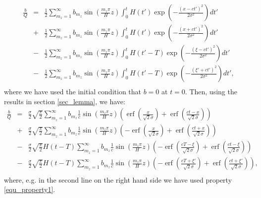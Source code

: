 \documentclass[12pt]{article}
\DeclareMathOperator\erf {erf}
\begin{document}
%
\begin{eqnarray}
\frac{b}{Q}  & = & \frac{1}{2} \sum_{m_z = 1}^{\infty} b_{m_z}\sin \left( \frac{m_z \pi} {H} z\right)\int_0^t H(t') \exp \left( - \frac{ (x-ct')^2 }{2 \sigma^2 } \right) dt'  \\ \nonumber
& + & \frac{1}{2} \sum_{m_z = 1}^{\infty} b_{m_z}  \sin \left( \frac{m_z \pi} {H} z\right) \int_0^t H(t') \exp \left( - \frac{ (x+ct')^2 }{2 \sigma^2} \right) dt' \\ \nonumber
& - & \frac{1}{2} \sum_{m_z = 1}^{\infty} b_{m_z} \sin \left( \frac{m_z \pi} {H} z\right) \int_0^t H(t'-T) \exp \left( - \frac{ (\xi-ct')^2 }{2 \sigma^2} \right) dt'  \\ \nonumber
& - & \frac{1}{2} \sum_{m_z = 1}^{\infty} b_{m_z}  \sin \left( \frac{m_z \pi} {H} z\right) \int_0^t  H(t'-T) \exp \left( - \frac{ ( \xi'+ct')^2 }{2 \sigma ^2} \right) dt', \\ \nonumber
\end{eqnarray}
%
where we have used the initial condition that $b=0$ at $t=0$. Then, using the results in section \ref{sec_lemma}, we have:
%
\begin{eqnarray}
\label{equ_ref}
\frac{b}{Q}  & = & \frac{\sigma}{2} \sqrt{ \frac{\pi}{2} } \sum_{m_z = 1}^{\infty} b_{m_z} \frac{1}{ c }\sin \left( \frac{m_z \pi} {H} z\right) \left(  \erf \left( \frac{x}{\sqrt{2} \sigma} \right) +  \erf \left( \frac{ct-x}{\sqrt{2} \sigma} \right)    \right)  \\ \nonumber
& + & \frac{\sigma}{2}  \sqrt{ \frac{\pi}{2} }  \sum_{m_z = 1}^{\infty} b_{m_z} \frac{ 1 }{ c } \sin \left( \frac{m_z \pi} {H} z\right)\left( - \erf \left( \frac{x}{\sqrt{2} \sigma} \right) + \erf \left( \frac{ct+x }{\sqrt{2} \sigma} \right)    \right) \\ \nonumber
& - & \frac{\sigma}{2}  \sqrt{ \frac{\pi}{2} }H(t-T) \sum_{m_z = 1}^{\infty} b_{m_z}  \frac{1 }{ c }  \sin \left( \frac{m_z \pi} {H} z\right) \left(- \erf \left( \frac{cT-\xi}{\sqrt{2} \sigma} \right) +  \erf \left( \frac{ct-\xi}{\sqrt{2} \sigma} \right)    \right)  \\ \nonumber
& - & \frac{\sigma }{2} \sqrt{ \frac{\pi}{2} }H(t-T)  \sum_{m_z = 1}^{\infty} b_{m_z}  \frac{1}{ c }  \sin \left( \frac{m_z \pi} {H} z\right) \left(- \erf \left( \frac{cT+\xi'}{\sqrt{2} \sigma} \right) +  \erf \left( \frac{ct +\xi'}{\sqrt{2} \sigma} \right)    \right), \\ \nonumber
\end{eqnarray}
%
where, e.g. in the second line on the right hand side we have used property \ref{equ_property1}. 
%
%
%
\end{document}
